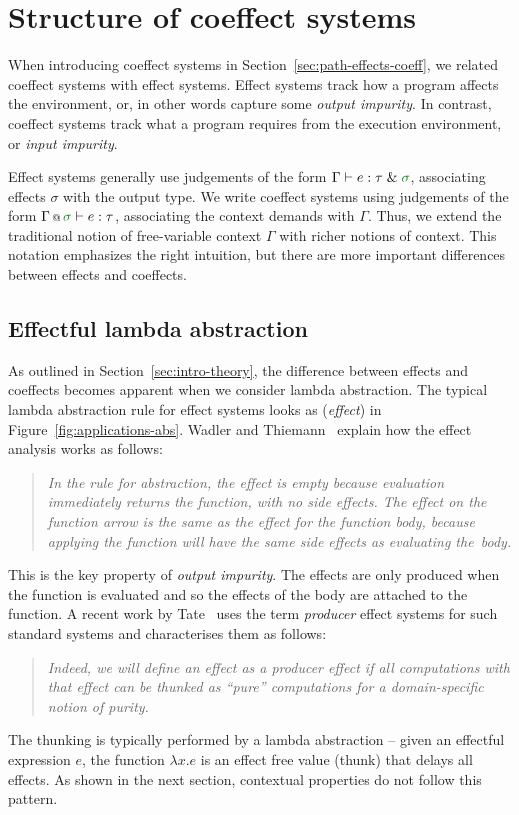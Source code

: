 \section{Structure of coeffect systems}
\label{sec:applications-structure}

When introducing coeffect systems in Section~\ref{sec:path-effects-coeff}, we related coeffect systems
with effect systems. Effect systems track how a program affects the environment, or, in other words
capture some \emph{output impurity}. In contrast, coeffect systems track what a program requires from
the execution environment, or \emph{input impurity}.

Effect systems generally use judgements of the form $\Gamma \vdash e : \tau \;\&\; \cclrd{\sigma}$,
associating effects $\sigma$ with the output type. We write coeffect
systems using judgements of the form $\coctx{\Gamma}{\cclrd{\sigma}} \vdash e : \tau$, associating
the context demands with $\Gamma$. Thus, we extend the traditional notion of free-variable
context $\Gamma$ with richer notions of context. This notation emphasizes the right intuition,
but there are more important differences between effects and coeffects.


\subsection{Effectful lambda abstraction}
\label{sec:applications-structure-lam}
As outlined in Section~\ref{sec:intro-theory}, the difference between effects and coeffects becomes 
apparent when we consider lambda abstraction. The typical lambda abstraction rule for effect systems 
looks as (\emph{effect}) in Figure~\ref{fig:applications-abs}. Wadler and 
Thiemann~\cite{monads-effects-marriage} explain how the effect analysis works as follows:
%
\begin{quote}
\emph{In the rule for abstraction, the effect is empty because evaluation immediately
returns the function, with no side effects. The effect on the function arrow
is the same as the effect for the function body, because applying the function will
have the same side effects as evaluating the~body.}
\end{quote}
%
This is the key property of \emph{output impurity}. The effects are only produced when the
function is evaluated and so the effects of the body are attached to the function. A recent
work by Tate~\cite{effects-producer-semantics} uses the term \emph{producer} effect systems
for such standard systems and characterises them as follows:
%
\begin{quote}
\emph{Indeed, we will define an effect as a producer effect if all computations with that
effect can be thunked as ``pure'' computations for a domain-specific notion of purity.}
\end{quote}
%
The thunking is typically performed by a lambda abstraction -- given an effectful expression
$e$, the function $\lambda x.e$ is an effect free value (thunk) that delays all effects.
As shown in the next section, contextual properties do not follow this pattern.

